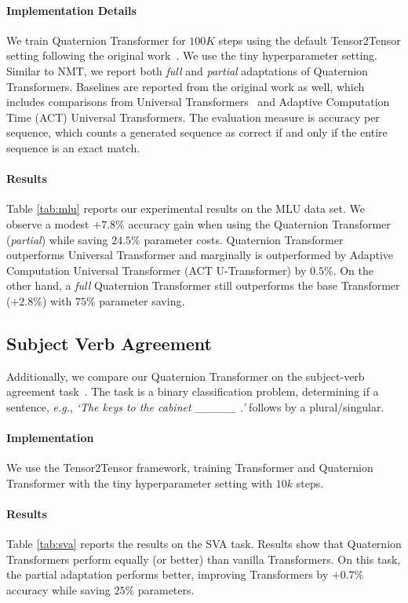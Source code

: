 \documentclass[11pt,a4paper]{article}
\begin{document}
\paragraph{Implementation Details} We train Quaternion Transformer for $100K$ steps using the default Tensor2Tensor setting following the original work~\cite{DBLP:journals/corr/abs-1812-02825}. We use the tiny hyperparameter setting. Similar to NMT, we report both \emph{full} and \emph{partial} adaptations of Quaternion Transformers. Baselines are reported from the original work as well, which includes comparisons from Universal Transformers~\cite{dehghani2018universal} and Adaptive Computation Time (ACT) Universal Transformers. The evaluation measure is accuracy per sequence, which counts a generated sequence as correct if and only if the entire sequence is an exact match.

\paragraph{Results} Table \ref{tab:mlu} reports our experimental results on the MLU data set. We observe a modest $+7.8\%$ accuracy gain when using the Quaternion Transformer (\emph{partial}) while saving $24.5\%$ parameter costs. Quaternion Transformer outperforms Universal Transformer and marginally is outperformed by Adaptive Computation Universal Transformer (ACT U-Transformer) by $0.5\%$.  On the other hand, a \emph{full} Quaternion Transformer still outperforms the base Transformer ($+2.8\%$) with $75\%$ parameter saving.



\subsection{Subject Verb Agreement}
Additionally, we compare our Quaternion Transformer on the subject-verb agreement task~\cite{linzen2016assessing}. The task is a binary classification problem, determining if a sentence, \emph{e.g.}, \textit{`The keys to the cabinet \_\_\_\_\_ .'} follows by a plural/singular.

\paragraph{Implementation} We use the Tensor2Tensor framework, training Transformer and Quaternion Transformer with the tiny hyperparameter setting with $10k$ steps.


\paragraph{Results} Table \ref{tab:sva} reports the results on the SVA task. Results show that Quaternion Transformers perform equally (or better) than vanilla Transformers. On this task, the partial adaptation performs better, improving Transformers by $+0.7\%$ accuracy while saving $25\%$ parameters.
\end{document}
